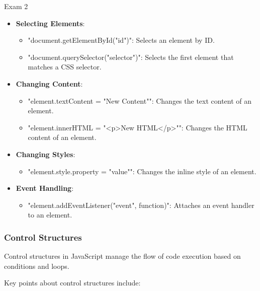\begin{examnotes}{Exam 2}
\begin{highlight}
        \begin{itemize}
            \item \textbf{Selecting Elements}:
                \begin{itemize}
                    \item "document.getElementById("id")": Selects an element by ID.
                    \item "document.querySelector("selector")": Selects the first element that matches a CSS selector.
                \end{itemize}
            \item \textbf{Changing Content}:
                \begin{itemize}
                    \item "element.textContent = "New Content"": Changes the text content of an element.
                    \item "element.innerHTML = "<p>New HTML</p>"": Changes the HTML content of an element.
                \end{itemize}
            \item \textbf{Changing Styles}:
                \begin{itemize}
                    \item "element.style.property = "value"": Changes the inline style of an element.
                \end{itemize}
            \item \textbf{Event Handling}:
                \begin{itemize}
                    \item "element.addEventListener("event", function)": Attaches an event handler to an element.
                \end{itemize}
        \end{itemize}
    \end{highlight}
    
    \subsubsection*{Control Structures}
    
    Control structures in JavaScript manage the flow of code execution based on conditions and loops.
    
    \begin{highlight}
        Key points about control structures include:
        

\end{highlight}
\end{examnotes}
